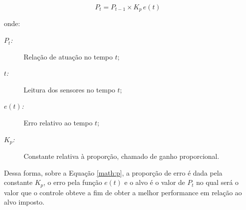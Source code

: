 \documentclass[portugues, brazil, a4paper,12pt]{article}
\begin{document}
		\begin{equation}
		P_{t} = P_{t-1} \times K_{p}\,{e(t)} \label{math:p}
		\end{equation}

		onde:

		\begin{description}
        	\item[$ P_t $\textit{:}] Relação de atuação no tempo $t$;
			\item[$ t $\textit{:}] Leitura dos sensores no tempo $t$;
			\item[$ e(t) $\textit{:}] Erro relativo ao tempo $ t $;
			\item[$ K_p $\textit{:}] Constante relativa à proporção, chamado de ganho proporcional.
		\end{description}

        Dessa forma, sobre a Equação \ref{math:p}, a proporção de erro é dada pela constante $K_p$, o erro pela função $ e(t) $ e o alvo é o valor de $ P_{t} $ no qual será o valor que o controle obteve a fim de obter a melhor performance em relação ao alvo imposto.
\end{document}
